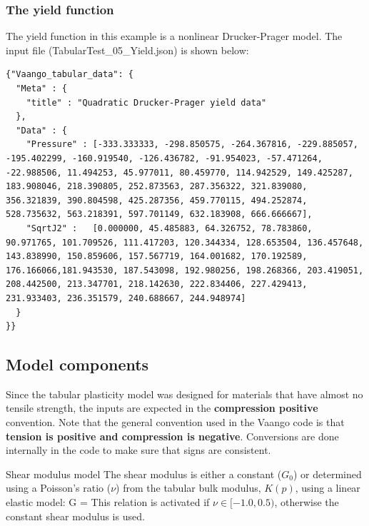 \subsubsection{The yield function}
The yield function in this example is a nonlinear Drucker-Prager model.  The input file
(\textsf{TabularTest\_05\_Yield.json}) is shown below:
\lstset{
  language=JSON
}
\begin{lstlisting}
{"Vaango_tabular_data": {
  "Meta" : {
    "title" : "Quadratic Drucker-Prager yield data"
  },
  "Data" : {
    "Pressure" : [-333.333333, -298.850575, -264.367816, -229.885057, -195.402299, -160.919540, -126.436782, -91.954023, -57.471264, -22.988506, 11.494253, 45.977011, 80.459770, 114.942529, 149.425287, 183.908046, 218.390805, 252.873563, 287.356322, 321.839080, 356.321839, 390.804598, 425.287356, 459.770115, 494.252874, 528.735632, 563.218391, 597.701149, 632.183908, 666.666667],
    "SqrtJ2" :   [0.000000, 45.485883, 64.326752, 78.783860, 90.971765, 101.709526, 111.417203, 120.344334, 128.653504, 136.457648, 143.838990, 150.859606, 157.567719, 164.001682, 170.192589, 176.166066,181.943530, 187.543098, 192.980256, 198.268366, 203.419051, 208.442500, 213.347701, 218.142630, 222.834406, 227.429413, 231.933403, 236.351579, 240.688667, 244.948974]
  }
}}
\end{lstlisting}

\subsection{Model components}
Since the tabular plasticity model was designed for materials that have almost no tensile strength,
the inputs are expected in the \textbf{compression positive} convention.  Note that the general
convention used in the Vaango code is that \textbf{tension is positive and compression is negative}.
Conversions are done internally in the code to make sure that signs are consistent.

\begin{SummaryBox}[label=box:TableShearModulusModel]{Shear modulus model}
  The shear modulus is either a constant ($G_0$) or determined using a Poisson's ratio ($\nu$)
  from the tabular bulk modulus, $K(p)$, using a linear elastic model:
  \Beq
    G = 
  \Eeq
  This relation is activated if $\nu \in [-1.0, 0.5)$, otherwise the constant shear modulus
  is used.
\end{SummaryBox}

